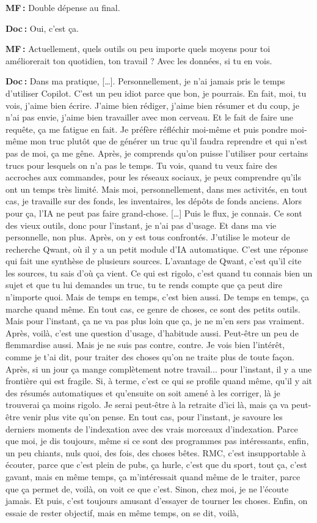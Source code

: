 \textbf{MF :} Double dépense au final.   

\textbf{Doc :} Oui, c'est ça. 

\textbf{MF :} Actuellement, quels outils ou peu importe quels moyens pour toi améliorerait ton quotidien, ton travail ? Avec les données, si tu en vois. 

\textbf{Doc :} Dans ma pratique, […]. Personnellement, je n'ai jamais pris le temps d'utiliser Copilot.  C'est un peu idiot parce que bon, je pourrais. En fait, moi, tu vois, j'aime bien écrire. J'aime bien rédiger, j'aime bien résumer et du coup, je n'ai pas envie, j'aime bien travailler avec mon cerveau. Et le fait de faire une requête, ça me fatigue en fait. Je préfère réfléchir moi-même et puis pondre moi-même mon truc plutôt que de générer un truc qu'il faudra reprendre et qui n’est pas de moi, ça me gêne. Après, je comprends qu'on puisse l'utiliser pour certains trucs pour lesquels on n'a pas le temps. Tu vois, quand tu veux faire des accroches aux commandes, pour les réseaux sociaux, je peux comprendre qu'ils ont un temps très limité. Mais moi, personnellement, dans mes activités, en tout cas, je travaille sur des fonds, les inventaires, les dépôts de fonds anciens. Alors pour ça, l'IA ne peut pas faire grand-chose. […] Puis le flux, je connais. Ce sont des vieux outils, donc pour l'instant, je n'ai pas d'usage. Et dans ma vie personnelle, non plus. Après, on y est tous confrontés. J'utilise le moteur de recherche Qwant, où il y a un petit module d'IA automatique. C'est une réponse qui fait une synthèse de plusieurs sources. L'avantage de Qwant, c'est qu'il cite les sources, tu sais d'où ça vient. Ce qui est rigolo, c'est quand tu connais bien un sujet et que tu lui demandes un truc, tu te rends compte que ça peut dire n'importe quoi. Mais de temps en temps, c'est bien aussi. De temps en temps, ça marche quand même. En tout cas, ce genre de choses, ce sont des petits outils.  Mais pour l'instant, ça ne va pas plus loin que ça, je ne m'en sers pas vraiment. Après, voilà, c'est une question d'usage, d'habitude aussi.  Peut-être un peu de flemmardise aussi. Mais je ne suis pas contre, contre. Je vois bien l’intérêt, comme je t'ai dit, pour traiter des choses qu'on ne traite plus de toute façon. Après, si un jour ça mange complètement notre travail... pour l'instant, il y a une frontière qui est fragile.  Si, à terme, c'est ce qui se profile quand même, qu'il y ait des résumés automatiques et qu'ensuite on soit amené à les corriger, là je trouverai ça moins rigolo. Je serai peut-être à la retraite d'ici là, mais ça va peut-être venir plus vite qu'on pense. En tout cas, pour l'instant, je savoure les derniers moments de l'indexation avec des vrais morceaux d'indexation. Parce que moi, je dis toujours, même si ce sont des programmes pas intéressants, enfin, un peu chiants, nuls quoi, des fois, des choses bêtes. RMC, c'est insupportable à écouter, parce que c'est plein de pubs, ça hurle, c'est que du sport, tout ça, c'est gavant, mais en même temps, ça m'intéressait quand même de le traiter, parce que ça permet de, voilà, on voit ce que c'est. Sinon, chez moi, je ne l'écoute jamais. Et puis, c'est toujours amusant d'essayer de tourner les choses. Enfin, on essaie de rester objectif, mais en même temps, on se dit, voilà, 